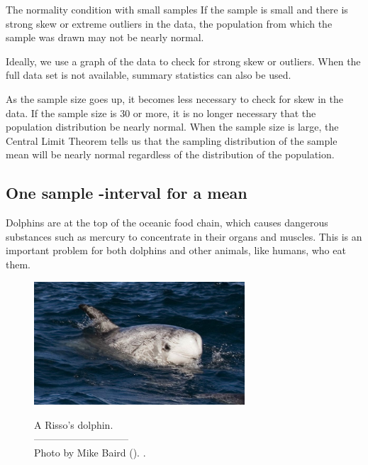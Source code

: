 \begin{onebox}{The normality condition with small samples}
{If the sample is small and there is strong skew or extreme outliers in the data, the population from which the sample was drawn may not be nearly normal. }
\end{onebox}

Ideally, we use a graph of the data to check for strong skew or outliers.  When the full data set is not available, summary statistics can also be used. 

As the sample size goes up, it becomes less necessary to check for skew in the data.  If the sample size is 30 or more, it is no longer necessary that the population distribution be nearly normal.  When the sample size is large, the Central Limit Theorem tells us that the sampling distribution of the sample mean will be nearly normal regardless of the distribution of the population.



\subsection[One sample $t$-interval for a mean]{One sample -interval for a mean}
\label{oneSampleTConfidenceIntervals}

Dolphins are at the top of the oceanic food chain, which causes dangerous substances such as mercury to concentrate in their organs and muscles. This is an important problem for both dolphins and other animals, like humans, who eat them.
\setlength{\captionwidth}{86mm}

\begin{figure}[h]
\centering
\includegraphics[width=0.7\textwidth]{ch_inference_for_means/figures/rissosDolphin/rissosDolphin.jpg}  \\
\addvspace{2mm}
\begin{minipage}{\textwidth}
   \caption[rissosDolphinPic]{A Risso's dolphin.\vspace{-1mm} \\
   -----------------------------\vspace{-2mm}\\
   {\footnotesize Photo by Mike Baird (). .\vspace{-10mm}}}
   \label{rissosDolphin}
\end{minipage}
\vspace{3mm}
\end{figure}
\setlength{\captionwidth}{\mycaptionwidth}

